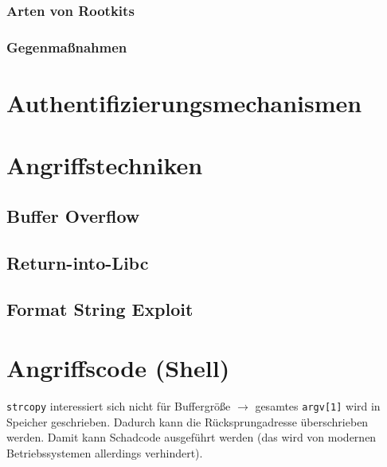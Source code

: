 \subsubsection*{Arten von Rootkits}
\subsubsection*{Gegenmaßnahmen}

\section{Authentifizierungsmechanismen}

\section{Angriffstechniken}

\subsection{Buffer Overflow}

\subsection{Return-into-Libc}

\subsection{Format String Exploit}

\section{Angriffscode (Shell)}


\lstinline`strcopy` interessiert sich nicht für Buffergröße $\to$ gesamtes \lstinline`argv[1]` wird in Speicher geschrieben. Dadurch kann die Rücksprungadresse überschrieben werden. Damit kann Schadcode ausgeführt werden (das wird von modernen Betriebssystemen allerdings verhindert).